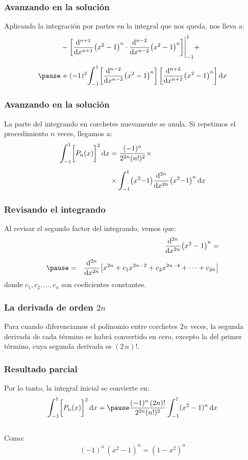 \documentclass[12pt]{beamer}
\begin{document}
\begin{frame}
\frametitle{Avanzando en la solución}
Aplicando la integración por partes en la integral que nos queda, nos lleva a:
\begin{eqnarray*}
\begin{aligned}
&- \bigg[ \dv[n+1]{x} (x^{2} - 1)^{n} \cdot \dv[n-2]{x} (x^{2} - 1)^{n} \bigg] \Bigg\lvert_{-1}^{1} + \\[0.5em] \pause
&+ (-1)^{2} \scaleint{6ex}_{\bs -1}^{1} \bigg[ \dv[n-2]{x} (x^{2} - 1)^{n} \bigg] \, \bigg[ \dv[n+2]{x} (x^{2} - 1)^{n} \bigg] \dd{x}
\end{aligned}
\end{eqnarray*}    
\end{frame}
\begin{frame}
\frametitle{Avanzando en la solución}
La parte del integrando en corchetes nuevamente se anula. \pause Si repetimos el procedimiento $n$ veces, llegamos a:
\pause
\begin{align*}
\scaleint{6ex}_{\bs -1}^{1} \bigg[ P_{n}(x) \bigg]^{2} \dd{x} &= \dfrac{(-1)^{n}}{2^{2n} (n!)^{2}} \times \\[0.5em]
&\times \scaleint{6ex}_{\bs -1}^{1} \big ( x^{2} {-} 1 \big) \dv[2n]{x} (x^{2} {-} 1)^{n} \dd{x}
\end{align*}
\end{frame}
\begin{frame}
\frametitle{Revisando el integrando}
Al revisar el segundo factor del integrando, vemos que:
\begin{eqnarray*}
&{}&\displaystyle \dv[2n]{x} (x^{2} - 1)^{n} = \\[0.5em] \pause
&=& \displaystyle \dv[2n]{x} \big[ x^{2n} + c_{1} x^{2n-2} + c_{2} x^{2n-4} + \cdots + c_{2n} \big]
\end{eqnarray*}
\pause
donde $c_{1}, c_{2}, \ldots, c_{n}$ son coeficientes constantes.
\end{frame}
\begin{frame}
\frametitle{La derivada de orden $2n$}
Para cuando diferenciamos el polinomio entre corchetes $2n$ veces, la segunda derivada de cada término se habrá convertido en cero, \pause excepto la del primer término, cuya segunda derivada es $(2 \, n)!$.
\end{frame}
\begin{frame}
\frametitle{Resultado parcial}
Por lo tanto, la integral inicial se convierte en:
\pause
\begin{align*}
\scaleint{6ex}_{\bs -1}^{1} \bigg[ P_{n}(x) \bigg]^{2} \dd{x} = \pause \dfrac{(-1)^{n} \, (2n)!}{2^{2n} (n!)^{2}} \, \scaleint{6ex}_{\bs -1}^{1} (x^{2} - 1)^{n} \dd{x}
\end{align*}
\\
\bigskip
\pause
Como:
\begin{align*}
(-1)^{n} \, (x^{2} - 1)^{n} = (1 - x^{2})^{n}
\end{align*}
\end{frame}
\end{document}
